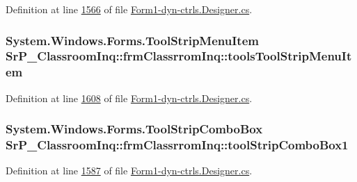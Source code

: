 \-Definition at line \hyperlink{_form1-dyn-ctrls_8_designer_8cs_source_l01566}{1566} of file \hyperlink{_form1-dyn-ctrls_8_designer_8cs_source}{\-Form1-\/dyn-\/ctrls.\-Designer.\-cs}.

\hypertarget{class_sr_p___classroom_inq_1_1frm_classrrom_inq_a89a0ae0ac6568cec51bb828874802c28}{
\subsubsection[{tools\-Tool\-Strip\-Menu\-Item}]{\setlength{\rightskip}{0pt plus 5cm}\-System.\-Windows.\-Forms.\-Tool\-Strip\-Menu\-Item {\bf \-Sr\-P\-\_\-\-Classroom\-Inq\-::frm\-Classrrom\-Inq\-::tools\-Tool\-Strip\-Menu\-Item}}}
\label{class_sr_p___classroom_inq_1_1frm_classrrom_inq_a89a0ae0ac6568cec51bb828874802c28}


\-Definition at line \hyperlink{_form1-dyn-ctrls_8_designer_8cs_source_l01608}{1608} of file \hyperlink{_form1-dyn-ctrls_8_designer_8cs_source}{\-Form1-\/dyn-\/ctrls.\-Designer.\-cs}.

\hypertarget{class_sr_p___classroom_inq_1_1frm_classrrom_inq_a0488696265840798a7bfd3cc7475f0af}{
\subsubsection[{tool\-Strip\-Combo\-Box1}]{\setlength{\rightskip}{0pt plus 5cm}\-System.\-Windows.\-Forms.\-Tool\-Strip\-Combo\-Box {\bf \-Sr\-P\-\_\-\-Classroom\-Inq\-::frm\-Classrrom\-Inq\-::tool\-Strip\-Combo\-Box1}}}
\label{class_sr_p___classroom_inq_1_1frm_classrrom_inq_a0488696265840798a7bfd3cc7475f0af}


\-Definition at line \hyperlink{_form1-dyn-ctrls_8_designer_8cs_source_l01587}{1587} of file \hyperlink{_form1-dyn-ctrls_8_designer_8cs_source}{\-Form1-\/dyn-\/ctrls.\-Designer.\-cs}.


